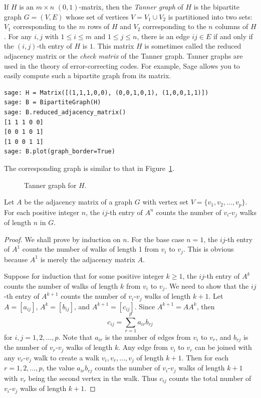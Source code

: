 If $H$ is an $m \times n$ $(0,1)$-matrix, then the \emph{Tanner graph}
of $H$ is the bipartite graph $G = (V,E)$ whose set of vertices
$V = V_1 \cup V_2$ is partitioned into two sets: $V_1$ corresponding
to the $m$ rows of $H$ and $V_2$ corresponding to the $n$ columns of $H$.
For any $i,j$ with $1 \leq i \leq m$ and $1 \leq j \leq n$, there is
an edge $ij \in E$ if and only if the $(i,j)$-th entry of $H$ is
$1$. This matrix $H$ is sometimes called the
reduced adjacency matrix or the \emph{check matrix} of the Tanner
graph. Tanner graphs are used in the theory of error-correcting
codes. For example, Sage allows you to easily compute such a bipartite
graph from its matrix.
%
\begin{lstlisting}
sage: H = Matrix([(1,1,1,0,0), (0,0,1,0,1), (1,0,0,1,1)])
sage: B = BipartiteGraph(H)
sage: B.reduced_adjacency_matrix()
[1 1 1 0 0]
[0 0 1 0 1]
[1 0 0 1 1]
sage: B.plot(graph_border=True)
\end{lstlisting}
%
The corresponding graph is similar to that in
Figure~\ref{fig:introduction:tanner_graph}.

\begin{figure}[!htbp]
\centering

\caption{Tanner graph for $H$.}
\label{fig:introduction:tanner_graph}
\end{figure}

\begin{theorem}
Let $A$ be the adjacency matrix of a graph $G$ with vertex set
$V = \{v_1, v_2, \dots, v_p\}$. For each positive integer $n$, the
$ij$-th entry of $A^n$ counts the number of $v_i$-$v_j$ walks of
length $n$ in $G$.
\end{theorem}

\begin{proof}
We shall prove by induction on $n$. For the base case $n = 1$, the
$ij$-th entry of $A^1$ counts the number of walks of length 1 from
$v_i$ to $v_j$. This is obvious because $A^1$ is merely the adjacency
matrix $A$.

Suppose for induction that for some positive integer $k \geq 1$, the
$ij$-th entry of $A^k$ counts the number of walks of length $k$ from
$v_i$ to $v_j$. We need to show that the $ij$-th entry of $A^{k+1}$
counts the number of $v_i$-$v_j$ walks of length $k + 1$. Let
$A = [a_{ij}]$, $A^k = [b_{ij}]$, and $A^{k+1} = [c_{ij}]$. Since
$A^{k+1} = A A^k$, then
\[
c_{ij}
=
\sum_{r=1}^p a_{ir} b_{rj}
\]
for $i,j = 1, 2, \dots, p$. Note that $a_{ir}$ is the number of edges
from $v_i$ to $v_r$, and $b_{rj}$ is the number of $v_r$-$v_j$ walks
of length $k$. Any edge from $v_i$ to $v_r$ can be joined with any
$v_r$-$v_j$ walk to create a walk $v_i, v_r, \dots, v_j$ of length
$k + 1$. Then for each $r = 1, 2, \dots, p$, the value $a_{ir} b_{rj}$
counts the number of $v_i$-$v_j$ walks of length $k + 1$ with $v_r$
being the second vertex in the walk. Thus $c_{ij}$ counts the total
number of $v_i$-$v_j$ walks of length $k + 1$.
\end{proof}


